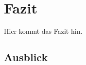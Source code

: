 \newpage

\section{Fazit} \label{fazit}
Hier kommt das Fazit hin.
\subsection{Ausblick} \label{ausblick}
